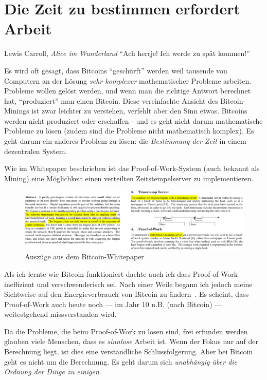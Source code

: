 \chapter{Die Zeit zu bestimmen erfordert Arbeit}
\label{les:17}

\begin{chapquote}{Lewis Carroll, \textit{Alice im Wunderland}}
\enquote{Ach herrje! Ich werde zu spät kommen!}
\end{chapquote}

Es wird oft gesagt, dass Bitcoins \enquote{geschürft} werden weil tausende von
Computern an der Lösung \textit{sehr komplexer} mathematischer Probleme
arbeiten. Probleme wollen gelöst werden, und wenn man die richtige Antwort
berechnet hat, \enquote{produziert} man einen Bitcoin. Diese vereinfachte
Ansicht des Bitcoin-Minings ist zwar leichter zu verstehen, verfehlt aber den
Sinn etwas. Bitcoins werden nicht produziert oder erschaffen - und es geht nicht
darum mathematische Probleme zu lösen (zudem sind die Probleme nicht
mathematisch komplex). Es geht darum ein anderes Problem zu lösen: die
\textit{Bestimmung der Zeit} in einem dezentralen System.

Wie im Whitepaper beschrieben ist das Proof-of-Work-System (auch bekannt als
Mining) eine Möglichkeit einen verteilten Zeitstempelserver zu implementieren.

\begin{figure}
  \includegraphics{assets/images/bitcoin-whitepaper-timestamp-wide.png}
  \caption{Auszüge aus dem Bitcoin-Whitepaper}
  \label{fig:bitcoin-whitepaper-timestamp-wide}
\end{figure}

Als ich lernte wie Bitcoin funktioniert dachte auch ich dass Proof-of-Work
ineffizient und verschwenderisch sei. Nach einer Weile begann ich jedoch meine
Sichtweise auf den Energieverbrauch von Bitcoin zu ändern~\cite{gigi:energy}. Es
scheint, dass Proof-of-Work auch heute noch --- im Jahr 10 n.B. (nach Bitcoin)
--- weitestgehend missverstanden wird.

Da die Probleme, die beim Proof-of-Work zu lösen sind, frei erfunden werden
glauben viele Menschen, dass es \textit{sinnlose} Arbeit ist. Wenn der Fokus nur
auf der Berechnung liegt, ist dies eine verständliche Schlussfolgerung. Aber bei
Bitcoin geht es nicht um die Berechnung. Es geht darum sich \textit{unabhängig
über die Ordnung der Dinge zu einigen}.

